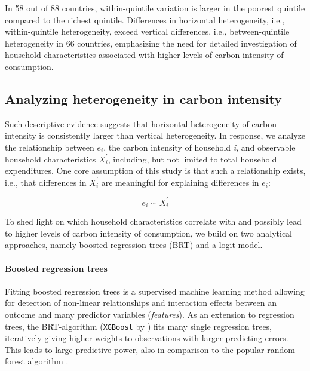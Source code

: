 \documentclass[12pt, a4paper]{article}
\begin{document}
In 58 out of 88 countries, within-quintile variation  is larger in the poorest quintile compared to the richest quintile. Differences in horizontal heterogeneity, i.e., within-quintile heterogeneity, exceed vertical differences, i.e., between-quintile heterogeneity in 66 countries, emphasizing the need for detailed investigation of household characteristics associated with higher levels of carbon intensity of consumption.

\subsection{Analyzing heterogeneity in carbon intensity} \label{sec:methods}

Such descriptive evidence suggests that horizontal heterogeneity of carbon intensity is consistently larger than vertical heterogeneity. In response, we analyze the relationship between $e_{i}$, the carbon intensity of household \textit{i}, and observable household characteristics $X_{i}^{'}$, including, but not limited to total household expenditures. One core assumption of this study is that such a relationship exists, i.e., that differences in $X_{i}^{'}$ are meaningful for explaining differences in $e_{i}$:

\begin{equation} \label{eq:relationship}
    e_{i} \sim X_{i}^{'}
\end{equation}


To shed light on which household characteristics correlate with and possibly lead to higher levels of carbon intensity of consumption, we build on two analytical approaches, namely boosted regression trees (BRT) and a logit-model.

\paragraph{Boosted regression trees} Fitting boosted regression trees \autocite{Friedman.2003, Elith.2008} is a supervised machine learning method allowing for detection of non-linear relationships and interaction effects between an outcome and many predictor variables (\textit{features}). As an extension to regression trees, the BRT-algorithm (\texttt{XGBoost} by \textcite{Chen.2016}) fits many single regression trees, iteratively giving higher weights to observations with larger predicting errors. This leads to large predictive power, also in comparison to the popular random forest algorithm \autocite[e.g.][]{Bentejac.2021}.
\end{document}
